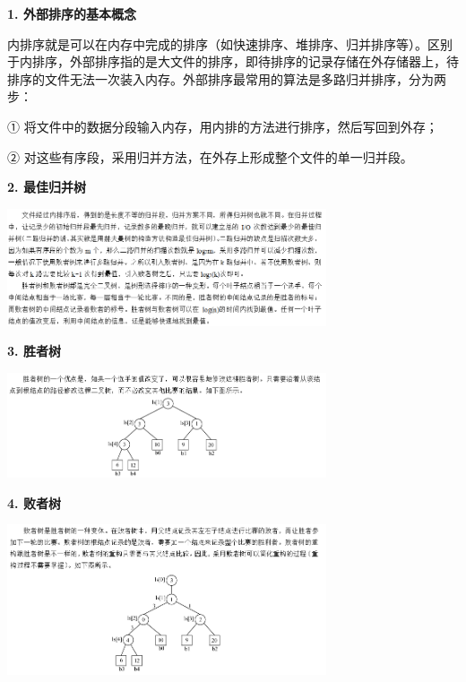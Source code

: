 {\textbf{1. 外部排序的基本概念}}

{内排序就是可以在内存中完成的排序（如快速排序、堆排序、归并排序等）。区别于内排序，外部排序指的是大文件的排序，即待排序的记录存储在外存储器上，待排序的文件无法一次装入内存。{外部排序最常用的算法是多路归并排序}，分为两步：}

{① 将文件中的数据分段输入内存，用内排的方法进行排序，然后写回到外存；}

{② 对这些有序段，采用归并方法，在外存上形成整个文件的单一归并段。}{}

{\textbf{2. 最佳归并树}}

\includegraphics[width=3.70833in,height=1.36458in]{png-jpeg-pics/7C0D015232CDC8CB5F63EF614F3C2D0A.png}

{\textbf{3. 胜者树}}

\includegraphics[width=3.70833in,height=1.21875in]{png-jpeg-pics/144878B1DFDF623E5FD212A310E768B5.png}

{\textbf{4. 败者树}}

{\includegraphics[width=3.70833in,height=1.75000in]{png-jpeg-pics/0D1188BB7CAF6C367D56C201AB36812E.png}}

